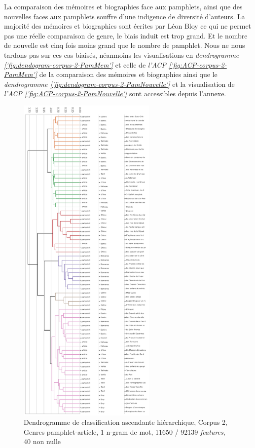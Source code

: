 \par
La comparaison des mémoires et biographies face aux pamphlets, ainsi que des nouvelles faces aux pamphlets souffre d'une indigence de diversité d'auteurs. La majorité des mémoires et biographies sont écrites par Léon Bloy ce qui ne permet pas une réelle comparaison de genre, le biais induit est trop grand. Et le nombre de nouvelle est cinq fois moins grand que le nombre de pamphlet. Nous ne nous tardons pas sur ces cas biaisés, néanmoins les visualisations en \textit{dendrogramme \ref{'fig:dendogram-corpus-2-PamMem'}} et celle de \textit{l'ACP \ref{'fig:ACP-corpus-2-PamMem'}} de la comparaison des mémoires et biographies ainsi que le \textit{dendrogramme \ref{'fig:dendogram-corpus-2-PamNouvelle'}} et la visualisation de \textit{l'ACP \ref{'fig:ACP-corpus-2-PamNouvelle'}} sont accessibles depuis l'annexe.

\begin{figure}[H]
\centering %
\includegraphics[width=0.60\textwidth]{img/dendogram-corpus-2-PamArticle.png}
\caption{Dendrogramme de classification ascendante hiérarchique, Corpus 2, Genres pamphlet-article, 1 n-gram de mot, 11650 / 92139 \textit{features}, 40 non nulle}
\label{'fig:dendogram-corpus-2-PamArticle'}
\end{figure}


